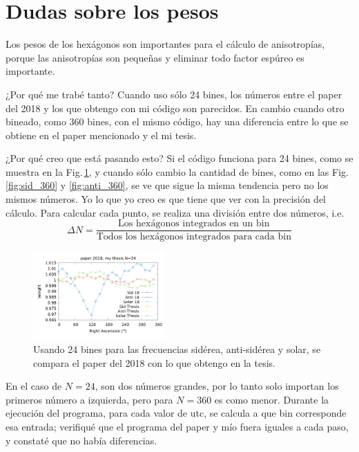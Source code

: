 
\section{Dudas sobre los pesos}

Los pesos de los hexágonos son importantes para el cálculo de anisotropías, porque las anisotropías son pequeñas y eliminar todo factor espúreo es importante.

¿Por qué me trabé tanto? Cuando uso sólo 24 bines, los números entre el paper del 2018 y los que obtengo con mi código son parecidos. En cambio cuando otro bineado, como 360 bines, con el mismo código, hay una diferencia entre lo que se obtiene en el paper mencionado y el mi tesis.

¿Por qué creo que está pasando esto? Si el código funciona para 24 bines, como se muestra en la Fig.\,\ref{fig:all_24}, y cuando sólo cambio la cantidad de bines, como en las Fig.\,\ref{fig:sid_360} y \ref{fig:anti_360}, se ve que sigue la misma tendencia pero no los mismos números. Yo lo que yo creo es que tiene que ver con la precisión del cálculo. Para calcular cada punto, se realiza una división entre dos números, i.e. 
\begin{equation}
	\Delta N = \frac{\text{Los hexágonos integrados en un bin}}{\text{Todos los hexágonos integrados para cada bin}}
\end{equation}


\begin{figure}[H]
	\centering
	\includegraphics[width=0.45\textwidth]{solar_anti_sid_my_and_paper_in_24.png}
	\caption{Usando 24 bines para las frecuencias sidérea, anti-sidérea y solar, se compara el paper del 2018 con lo que obtengo en la tesis.}
	\label{fig:all_24}
\end{figure}


En el caso de $N=24$, son dos números grandes, por lo tanto solo importan los primeros número a izquierda, pero para  $N=360$ es como menor. Durante la ejecución del programa, para cada valor de utc, se calcula a que bin corresponde esa entrada; verifiqué que el programa del paper y mío fuera iguales a cada paso, y constaté que no había diferencias.

